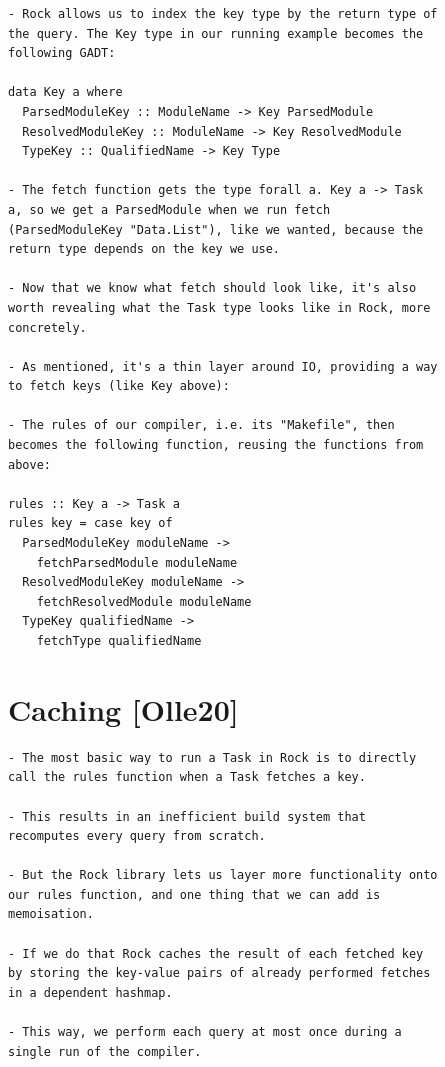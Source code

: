 \documentclass[12pt, a4paper]{report}
\begin{document}
\begin{verbatim}
- Rock allows us to index the key type by the return type of
the query. The Key type in our running example becomes the
following GADT:

data Key a where
  ParsedModuleKey :: ModuleName -> Key ParsedModule
  ResolvedModuleKey :: ModuleName -> Key ResolvedModule
  TypeKey :: QualifiedName -> Key Type

- The fetch function gets the type forall a. Key a -> Task
a, so we get a ParsedModule when we run fetch
(ParsedModuleKey "Data.List"), like we wanted, because the
return type depends on the key we use.

- Now that we know what fetch should look like, it's also
worth revealing what the Task type looks like in Rock, more
concretely.

- As mentioned, it's a thin layer around IO, providing a way
to fetch keys (like Key above):

- The rules of our compiler, i.e. its "Makefile", then
becomes the following function, reusing the functions from
above:

rules :: Key a -> Task a
rules key = case key of
  ParsedModuleKey moduleName ->
    fetchParsedModule moduleName
  ResolvedModuleKey moduleName ->
    fetchResolvedModule moduleName
  TypeKey qualifiedName ->
    fetchType qualifiedName
\end{verbatim}
\cite{olle_query_based}

\section*{Caching [Olle20]}

\begin{verbatim}
- The most basic way to run a Task in Rock is to directly
call the rules function when a Task fetches a key.

- This results in an inefficient build system that
recomputes every query from scratch.

- But the Rock library lets us layer more functionality onto
our rules function, and one thing that we can add is
memoisation.

- If we do that Rock caches the result of each fetched key
by storing the key-value pairs of already performed fetches
in a dependent hashmap.

- This way, we perform each query at most once during a
single run of the compiler.
\end{verbatim}
\cite{olle_query_based}
\end{document}
